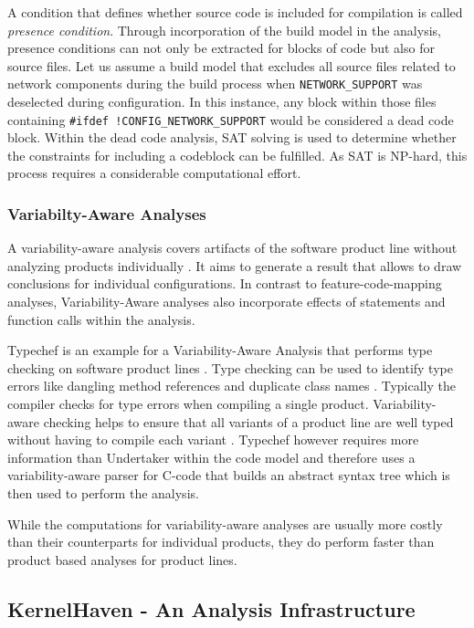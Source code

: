 \documentclass[a4paper]{article}
\begin{document}
A condition that defines whether source code is included for compilation is called \emph{presence condition}. Through incorporation of the build model in the analysis, presence conditions can not only be extracted for blocks of code but also for source files. Let us assume a build model that excludes all source files related to network components during the build process when \texttt{NETWORK\_SUPPORT} was deselected during configuration. In this instance, any block within those files containing \texttt{\#ifdef !CONFIG\_NETWORK\_SUPPORT} would be considered a dead code block. Within the dead code analysis, SAT solving is used to determine whether the constraints for including a codeblock can be fulfilled. As SAT is NP-hard, this process requires a considerable computational effort.

\subsubsection{Variabilty-Aware Analyses}

A variability-aware analysis covers artifacts of the software product line without analyzing products individually \cite[p.261]{Apel:2013:FSP:2541773}. It aims to generate a result that allows to draw conclusions for individual configurations. In contrast to feature-code-mapping analyses, Variability-Aware analyses also incorporate effects of statements and function calls within the analysis.

Typechef is an example for a Variability-Aware Analysis that performs type checking on software product lines \cite{Dietrich:2012:RAV:2362536.2362544}. Type checking can be used to identify type errors like dangling method references and duplicate class names \cite{Thum:2014:CSA:2620784.2580950}. Typically the compiler checks for type errors when compiling a single product.  Variability-aware  checking helps to ensure that all variants of a product line are well typed without having to compile each variant \cite{Kenner:2010:TTT:1868688.1868693}. Typechef however requires more information than Undertaker within the code model and therefore uses a variability-aware parser for C-code that builds an abstract syntax tree which is then used to perform the analysis.

While the computations for variability-aware analyses are usually more costly than their counterparts for individual products, they do perform faster than product based analyses for product lines.

\newpage
\subsection{KernelHaven - An Analysis Infrastructure}\label{kernelhaven}
\end{document}
